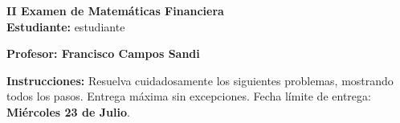 \begin{center}
    {\LARGE \textbf{II Examen de Matemáticas Financiera}}\\[1em]
    {\large \textbf{Estudiante:} {{ estudiante }}}
\end{center}

\vspace{1cm}

\textbf{Profesor: Francisco Campos Sandi}

\vspace{0.5cm}

\textbf{Instrucciones:} Resuelva cuidadosamente los siguientes problemas, mostrando todos los pasos. Entrega máxima sin excepciones. Fecha límite de entrega: \textbf{Miércoles 23 de Julio}.

\vspace{1cm}

